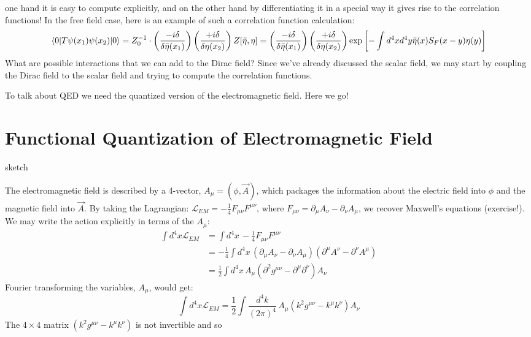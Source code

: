 \documentclass{report}
\theoremstyle{plain}
\theoremstyle{definition}
\theoremstyle{remark}
\newcommand{\FR}[2]{\frac{#1}{#2}}
\newcommand{\mc}{\mathcal}
\newcommand{\di}{\partial}
\newcommand{\colr}[1]{ {\color{red} #1 } }
\begin{document}
one hand it is easy to compute explicitly, and on the other hand by
differentiating it in a special way it gives rise to the correlation
functions! In the free field case, here is an example of such a correlation
function calculation:
\begin{align*}
    \braket{0|T\psi(x_1)\psi(x_2)|0} = 
    Z_0^{-1} \cdot \left(
    \FR{-i\delta}{\delta\bar\eta(x_1)}
    \right)\left( \FR{+i\delta}{\delta\eta(x_2)}\right) Z[\bar\eta,\eta] 
        =
    \left(
    \FR{-i\delta}{\delta\bar\eta(x_1)}
    \right)\left( \FR{+i\delta}{\delta\eta(x_2)} \right)
\exp\left[ -\int d^4xd^4y
\bar\eta(x)S_F(x-y)\eta(y) \right]
\end{align*}
What are possible interactions that we can add to the Dirac field? Since
we've already discussed the scalar field, we may start by coupling the
Dirac field to the scalar field and trying to compute the correlation
functions.


To talk about QED we need the quantized version of the electromagnetic
field. Here we go!
\section{Functional Quantization of Electromagnetic Field}
\colr{sketch}

The electromagnetic field is described by a 4-vector, $A_\mu = (\phi,\vec
A)$, which packages the information about the electric field into $\phi$
and the magnetic field into $\vec A$. By taking the Lagrangian: $\mc L_{EM}
=-\FR{1}{4}F_{\mu\nu}F^{\mu\nu}$, where $F_{\mu\nu} = \di_\mu A_\nu
-\di_\nu A_\mu$, we recover Maxwell's equations (exercise!). We may write
the action explicitly in terms of the $A_\mu$:
\begin{align*}
    \int d^4x \mc L_{EM} &= \int d^4x\, -\FR{1}{4}F_{\mu\nu}F^{\mu\nu}\\
    &= -\FR{1}{4} \int d^4x\, \left( \di_\mu A_\nu - \di_\nu A_\mu \right)
    \left( \di^\mu A^\nu - \di^\nu A^\mu \right)\\
    &= \FR{1}{2}\int d^4x\, A_\mu(\di^2g^{\mu\nu} -\di^\mu\di^\nu) A_\nu
\end{align*}
Fourier transforming the variables, $A_\mu$, would get:
\[ 
    \int d^4x \mc L_{EM} =
    \FR{1}{2}\int \FR{d^4k}{(2\pi)^4}\, A_\mu(k^2g^{\mu\nu} -k^\mu k^\nu) A_\nu
\]
The $4\times 4$ matrix $(k^2g^{\mu\nu} -k^\mu k^\nu)$ is not invertible and
so
\end{document}
